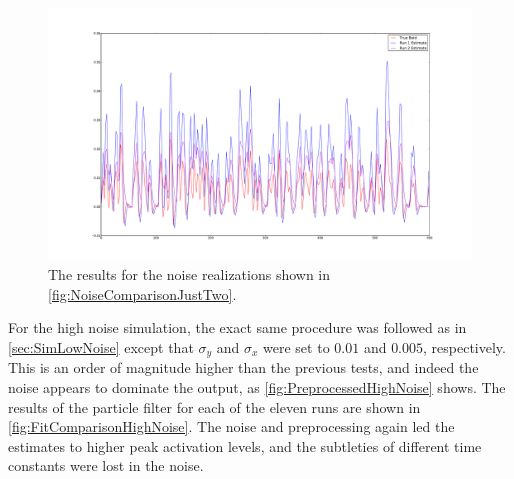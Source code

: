 \begin{figure}
\includegraphics[clip=true,trim=6cm 2cm 5cm 3.5cm,width=15cm]{images/comparison_highnoise_just2}
\caption{The results for the noise realizations shown in \autoref{fig:NoiseComparisonJustTwo}.}
\label{fig:FitComparisonHighNoiseJust2}
\end{figure}

For the high noise simulation, the exact same procedure was followed as in \autoref{sec:SimLowNoise}
except that $\sigma_y$ and $\sigma_x$ were set to $0.01$ and $0.005$,
respectively. This is an order of magnitude higher than the previous tests, and indeed the
noise appears to dominate the output, as \autoref{fig:PreprocessedHighNoise} shows.
The results of the particle filter
for each of the eleven runs are shown in \autoref{fig:FitComparisonHighNoise}.
The noise and preprocessing again led the estimates
to higher peak activation levels, and the subtleties of different time constants
were lost in the noise.

